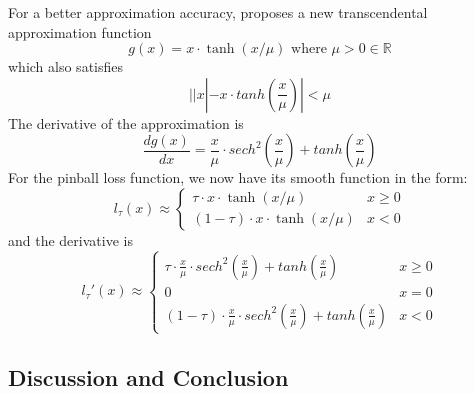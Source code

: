 For a better approximation accuracy, \citeauthor{bagulSMOOTHTRANSCENDENTALAPPROXIMATION2017}\cite{bagulSMOOTHTRANSCENDENTALAPPROXIMATION2017} proposes a new transcendental approximation function 
 \begin{equation}
    g(x) = x \cdot \tanh(x/\mu) \text{  where } \mu > 0 \in \mathbb{R}
 \end{equation}
which also satisfies
\begin{equation}
    ||x| - x \cdot tanh(\frac{x}{\mu})| < \mu
\end{equation}
The derivative of the approximation is
\begin{equation}
    \frac{dg(x)}{dx} = \frac{x}{\mu} \cdot sech^2 (\frac{x}{\mu}) + tanh(\frac{x}{\mu})
\end{equation}
For the pinball loss function, we now have its smooth function in the form:
\begin{equation}
    l_\tau(x) \approx 
    \begin{cases}
        \tau \cdot x \cdot \tanh(x/\mu) & {x\geq 0}\\
        (1-\tau) \cdot x \cdot \tanh(x/\mu) & {x < 0}
    \end{cases}
\end{equation}
and the derivative is
\begin{equation}
\label{eq:smooth_new_d}
    l_\tau\prime(x) \approx 
    \begin{cases}
        \tau \cdot \frac{x}{\mu} \cdot sech^2 (\frac{x}{\mu}) + tanh(\frac{x}{\mu}) & {x\geq 0}\\
        0 & {x=0}\\
        (1-\tau) \cdot \frac{x}{\mu} \cdot sech^2 (\frac{x}{\mu}) + tanh(\frac{x}{\mu}) & {x < 0}
    \end{cases}
\end{equation}
\subsection{Discussion and Conclusion}

